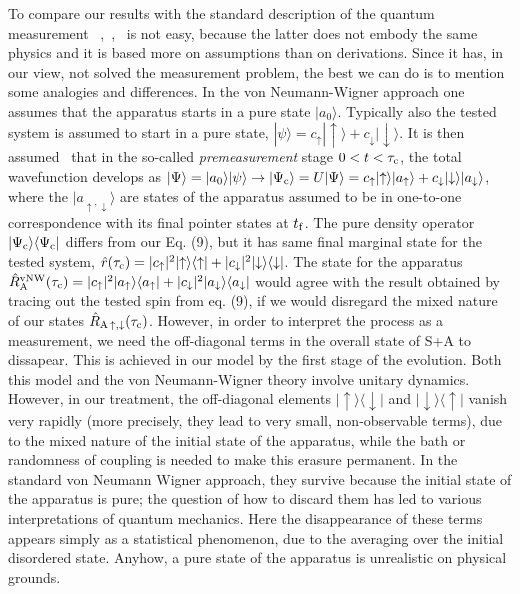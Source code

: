 \documentclass[aps,prb,floatfix,twocolumn]{revtex4}
\newcommand{\tauc}{{\tau_{\rm c}}}
\newcommand{\RA}{{\rm A}}
\newcommand{\down}{{\downarrow}}
\newcommand{\up}{{\uparrow}}
\newcommand{\tf}{t_{\rm f}}
\begin{document}
To compare our results with the standard description of the quantum measurement
~\cite{wh},~\cite{deMuynck},~\cite{Schlosshauer}
is not easy, because the latter does not embody the same physics and 
it is based more on assumptions than on derivations. 
Since it has, in our view, not solved the measurement problem,
the best we can do is to mention some analogies and differences.
In the von Neumann-Wigner approach one assumes that the apparatus starts 
in a pure state $|a_0\rangle$. 
Typically also the tested system is assumed to start in a pure state, 
$|\psi\rangle=c_\up|\up\rangle+c_\down|\down\rangle$. 
It is then assumed~\cite{deMuynck} that in the so-called {\it premeasurement} stage
$0<t<\tauc$, 
the total wavefunction develops as $|\Psi\rangle=|a_0\rangle|\psi\rangle\to 
|\Psi_{\rm c}\rangle=U|\Psi\rangle
=c_\up|\up\rangle|a_\up\rangle+c_\down|\down\rangle |a_\down\rangle$, where
the $|a_{\up,\down}\rangle$ are states of the apparatus assumed to be in 
one-to-one correspondence with its final pointer states at $\tf$.
The pure density operator $|\Psi_{\rm c}\rangle\langle\Psi_{\rm c}|$ differs
from our Eq. (9), but it has same final marginal state for the tested system, 
$\hat r(\tauc)=|c_\up|^2|\up\rangle\langle \up|+|c_\down|^2|\down\rangle\langle\down|$. 
The state for the apparatus 
$\hat R_\RA^{\rm vNW}(\tauc)=%
|c_\up|^2|a_\up\rangle\langle a_\up|
+|c_\down|^2|a_\down\rangle\langle a_\down|$
would agree with the result obtained by tracing out the tested spin from eq. (9), 
if we would disregard the mixed nature of our states 
$\hat R_{\RA\,\up,\down}(\tauc)$. 
However, in order to interpret the process as a measurement, we need the off-diagonal terms 
in the overall state of S+A to dissapear. This is achieved in our model by the first stage of
 the evolution. Both this model and the 
von Neumann-Wigner theory involve unitary dynamics. However, in our treatment,
the off-diagonal elements $|\up\rangle\langle \down|$ 
and $|\down\rangle\langle \up|$  vanish very rapidly (more precisely, they lead to very 
small, non-observable terms), due to the mixed nature of the initial state of the apparatus,
while the bath or randomness of coupling is needed to make this erasure permanent. 
In the standard von Neumann Wigner approach, they survive because the initial state of the
 apparatus is pure; 
the question of how to discard  them has led to various interpretations of quantum mechanics. 
Here the disappearance of these terms appears simply as a statistical phenomenon, due to the 
averaging over the initial disordered state. Anyhow, a pure state of the apparatus is 
unrealistic on physical grounds.  
\end{document}
